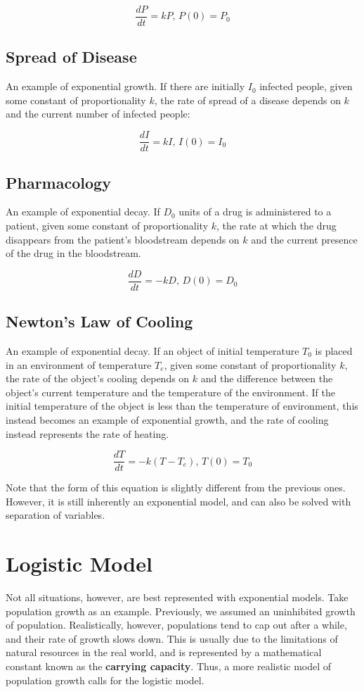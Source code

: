 \documentclass[11pt]{article}
\begin{document}
\[ \frac{dP}{dt} = kP\text{, }P(0)=P_0 \]

\subsection*{Spread of Disease}
An example of exponential growth. If there are initially $I_0$ infected people, given some constant of proportionality $k$, the rate of spread of a disease depends on $k$ and the current number of infected people:

\[ \frac{dI}{dt} = kI\text{, }I(0)=I_0 \]

\subsection*{Pharmacology}
An example of exponential decay. If $D_0$ units of a drug is administered to a patient, given some constant of proportionality $k$, the rate at which the drug disappears from the patient's bloodstream depends on $k$ and the current presence of the drug in the bloodstream.

\[ \frac{dD}{dt} = -kD\text{, }D(0)=D_0 \]

\subsection*{Newton's Law of Cooling}
An example of exponential decay. If an object of initial temperature $T_0$ is placed in an environment of temperature $T_e$, given some constant of proportionality $k$, the rate of the object's cooling depends on $k$ and the difference between the object's current temperature and the temperature of the environment. If the initial temperature of the object is less than the temperature of environment, this instead becomes an example of exponential growth, and the rate of cooling instead represents the rate of heating.

\[ \frac{dT}{dt} = -k(T-T_e)\text{, }T(0)=T_0\]

Note that the form of this equation is slightly different from the previous ones. However, it is still inherently an exponential model, and can also be solved with separation of variables.

\section{Logistic Model}
Not all situations, however, are best represented with exponential models. Take population growth as an example. Previously, we assumed an uninhibited growth of population. Realistically, however, populations tend to cap out after a while, and their rate of growth slows down. This is usually due to the limitations of natural resources in the real world, and is represented by a mathematical constant known as the \textbf{carrying capacity}. Thus, a more realistic model of population growth calls for the logistic model.
\end{document}
